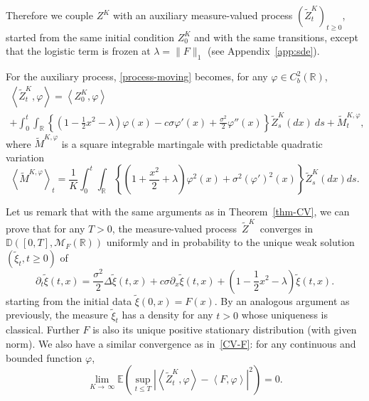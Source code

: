 \documentclass[AHL,Unicode,longabstracts,published]{cedram}
\newcommand{\Mo}{\mathcal{M}}
\newcommand*\D{\mathbb{D}}
\newcommand*\R{\mathbb{R}}
\newcommand*\E{\mathbb{E}}
\begin{document}
 Therefore we couple $Z^{K}$ with an auxiliary measure-valued process $(\widetilde{Z}^{K}_{t})_{t \ge 0}$, started from the same initial condition $Z_{0}^K$ and with the same transitions, except that the logistic term is frozen at $\lambda=\|F\|_1$ (see Appendix~\ref{app:sde}).

For the auxiliary process, \eqref{process-moving} becomes, for any $\varphi\in C^2_{b}(\R)$,
\begin{multline}\label{ref:partSys}
\left\langle\widetilde{Z}^{K}_{t},\varphi\right\rangle
=\left\langle {Z}^{K}_{0},\varphi\right\rangle\\
+ \int_0^t \int_{\R} \left\{ \left(1-\frac{1}{2}x^2-\lambda\right)\varphi(x)-c\sigma \varphi'(x)+\frac{\sigma^2}{2}\varphi''(x)\right\}\widetilde{Z}^{K}_{s}(dx) \ ds+\widetilde M^{K,\varphi}_{t},
\end{multline}
where $\widetilde M^{K, \varphi}$ is a square integrable martingale with predictable quadratic variation
\begin{equation}\label{qvAux}
\left\langle \widetilde M^{K, \varphi}\right\rangle_{t}= \frac{1}{K} \int_{0}^t \int_{\R} \left\{ \left(1+\frac{x^2}{2} + \lambda\right)\varphi^2(x) + {\sigma^2} \left(\varphi'\right)^2(x) \right\} \widetilde Z^{K}_{s}(dx) ds.
\end{equation}



Let us remark that with the same arguments as in Theorem~\ref{thm-CV}, we can prove that for any $T>0$, the measure-valued process $\,\widetilde{Z}^{K}\,$ converges in $\D([0,T],\Mo_F(\R))$ uniformly and in probability to the unique weak solution $(\widetilde \xi_{t}, t\ge 0)$ of
\begin{equation}\label{moving-lin}
\partial_{t}\widetilde \xi(t,x) =\frac{\sigma^2}{2}\Delta \widetilde \xi(t,x)+c\sigma \partial_{x}\widetilde \xi(t,x)+\left(1-\frac{1}{2}x^2- \lambda \right)\widetilde \xi(t,x).
\end{equation}
starting from the initial data $\widetilde \xi(0,x) = F(x)$. By an analogous argument as previously, the measure $\widetilde \xi_{t}$ has a density for any $t>0$ whose uniqueness is classical. Further $F$ is also its unique positive stationary distribution (with given norm). We also have a similar convergence as in~\eqref{CV-F}: for any continuous and bounded function $\varphi$,
\begin{equation}\label{CV-L2tilde}
\lim_{K \to\,\infty}\E\left(\sup_{t \le T} \left|\left\langle \widetilde Z^{K}_{t},\varphi\right\rangle - \left\langle F,\varphi\right\rangle\right|^2\right) = 0.
\end{equation}
\end{document}

